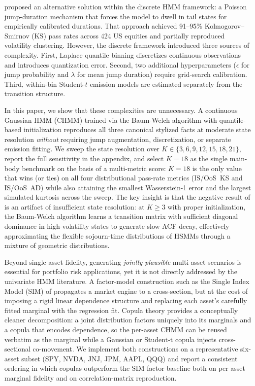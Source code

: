 \citet{alswaidan2026hybrid} proposed an alternative solution within the discrete HMM framework: a Poisson jump-duration mechanism that forces the model to dwell in tail states for empirically calibrated durations.
That approach achieved 91--95\% Kolmogorov--Smirnov (KS) pass rates across 424 US equities and partially reproduced volatility clustering.
However, the discrete framework introduced three sources of complexity.
First, Laplace quantile binning discretizes continuous observations and introduces quantization error.
Second, two additional hyperparameters ($\epsilon$ for jump probability and $\lambda$ for mean jump duration) require grid-search calibration.
Third, within-bin Student-$t$ emission models are estimated separately from the transition structure.

In this paper, we show that these complexities are unnecessary.
A continuous Gaussian HMM (CHMM) trained via the Baum-Welch algorithm \cite{baum1970maximization, rabiner1986introduction} with quantile-based initialization reproduces all three canonical stylized facts at moderate state resolution \emph{without} requiring jump augmentation, discretization, or separate emission fitting.
We sweep the state resolution over $K \in \{3, 6, 9, 12, 15, 18, 21\}$, report the full sensitivity in the appendix, and select $K = 18$ as the single main-body benchmark on the basis of a multi-metric score: $K = 18$ is the only value that wins (or ties) on all four distributional pass-rate metrics (IS/OoS~KS and IS/OoS~AD) while also attaining the smallest Wasserstein-1 error and the largest simulated kurtosis across the sweep.
The key insight is that the negative result of \citet{ryden1998stylized} is an artifact of insufficient state resolution: at $K \geq 3$ with proper initialization, the Baum-Welch algorithm learns a transition matrix with sufficient diagonal dominance in high-volatility states to generate slow ACF decay, effectively approximating the flexible sojourn-time distributions of HSMMs through a mixture of geometric distributions.

Beyond single-asset fidelity, generating \emph{jointly plausible} multi-asset scenarios is essential for portfolio risk applications, yet it is not directly addressed by the univariate HMM literature.
A factor-model construction such as the Single Index Model (SIM) of \citet{sharpe1963simplified} propagates a market engine to a cross-section, but at the cost of imposing a rigid linear dependence structure and replacing each asset's carefully fitted marginal with the regression fit.
Copula theory \cite{sklar1959fonctions, nelsen2006introduction} provides a conceptually cleaner decomposition: a joint distribution factors uniquely into its marginals and a copula that encodes dependence, so the per-asset CHMM can be reused verbatim as the marginal while a Gaussian or Student-t copula \cite{demarta2005tcopula, mcneil2015quantitative} injects cross-sectional co-movement. We implement both constructions on a representative six-asset subset (SPY, NVDA, JNJ, JPM, AAPL, QQQ) and report a consistent ordering in which copulas outperform the SIM factor baseline both on per-asset marginal fidelity and on correlation-matrix reproduction.

